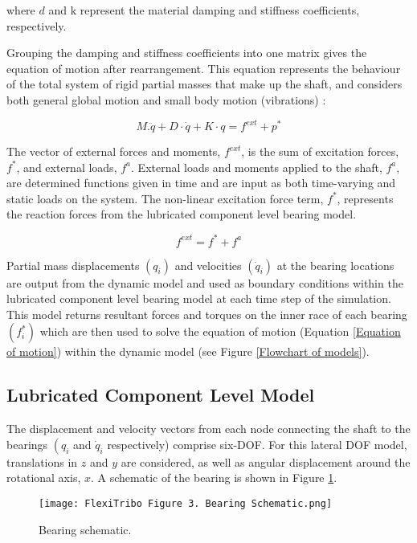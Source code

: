 where $d$ and $\mathrm{k}$ represent the material damping and stiffness coefficients, respectively.

Grouping the damping and stiffness coefficients into one matrix gives the equation of motion after rearrangement. This equation represents the behaviour of the total system of rigid partial masses that make up the shaft, and considers both general global motion and small body motion (vibrations) \cite{Offner2011}:

\begin{equation}\label{Equation of motion}
	M . \ddot{q}+D \cdot \dot{q}+K \cdot q=f^{e x t}+p^*
\end{equation}

The vector of external forces and moments, $f^{e x t}$, is the sum of excitation forces, $f^*$, and external loads, $f^a$. External loads and moments applied to the shaft, $f^a$, are determined functions given in time and are input as both time-varying and static loads on the system. The non-linear excitation force term, $f^*$, represents the reaction forces from the lubricated component level bearing model.

\begin{equation}\label{External forces}
	f^{e x t}=f^*+f^a
\end{equation}

Partial mass displacements $\left(q_i\right)$ and velocities $\left(\dot{q}_i\right)$ at the bearing locations are output from the dynamic model and used as boundary conditions within the lubricated component level bearing model at each time step of the simulation. This model returns resultant forces and torques on the inner race of each bearing $\left(f_i^*\right)$ which are then used to solve the equation of motion (Equation \ref{Equation of motion}) within the dynamic model (see Figure \ref{Flowchart of models}).

\subsection{Lubricated Component Level Model} \label{Contact mechanics FMBD}
The displacement and velocity vectors from each node connecting the shaft to the bearings $\left(q_i\right.$ and $\dot{q}_i$ respectively) comprise six-DOF. For this lateral DOF model, translations in $z$ and $y$ are considered, as well as angular displacement around the rotational axis, $x$. A schematic of the bearing is shown in Figure \ref{Bearing schematic}.

\begin{figure}  
	\texttt{[image: FlexiTribo Figure 3. Bearing Schematic.png]}
	\caption{Bearing schematic.}
	\label{Bearing schematic}
\end{figure} 

